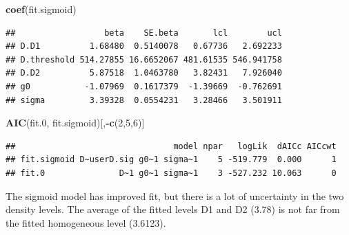 \documentclass[
]{book}
\newenvironment{Shaded}{\begin{snugshade}}{\end{snugshade}}
\newcommand{\DecValTok}[1]{\textcolor[rgb]{0.00,0.00,0.81}{#1}}
\newcommand{\FloatTok}[1]{\textcolor[rgb]{0.00,0.00,0.81}{#1}}
\newcommand{\FunctionTok}[1]{\textcolor[rgb]{0.13,0.29,0.53}{\textbf{#1}}}
\newcommand{\NormalTok}[1]{#1}
\newcommand{\SpecialCharTok}[1]{\textcolor[rgb]{0.81,0.36,0.00}{\textbf{#1}}}
\begin{document}
\begin{Shaded}
\begin{Highlighting}[]
\FunctionTok{coef}\NormalTok{(fit.sigmoid)}
\end{Highlighting}
\end{Shaded}

\begin{verbatim}
##                  beta    SE.beta       lcl        ucl
## D.D1          1.68480  0.5140078   0.67736   2.692233
## D.threshold 514.27855 16.6652067 481.61535 546.941758
## D.D2          5.87518  1.0463780   3.82431   7.926040
## g0           -1.07969  0.1617379  -1.39669  -0.762691
## sigma         3.39328  0.0554231   3.28466   3.501911
\end{verbatim}

\begin{Shaded}
\begin{Highlighting}[]
\FunctionTok{AIC}\NormalTok{(fit}\FloatTok{.0}\NormalTok{, fit.sigmoid)[,}\SpecialCharTok{{-}}\FunctionTok{c}\NormalTok{(}\DecValTok{2}\NormalTok{,}\DecValTok{5}\NormalTok{,}\DecValTok{6}\NormalTok{)]}
\end{Highlighting}
\end{Shaded}

\begin{verbatim}
##                                model npar   logLik  dAICc AICcwt
## fit.sigmoid D~userD.sig g0~1 sigma~1    5 -519.779  0.000      1
## fit.0               D~1 g0~1 sigma~1    3 -527.232 10.063      0
\end{verbatim}

The sigmoid model has improved fit, but there is a lot of uncertainty in the two density levels. The average of the fitted levels D1 and D2 (3.78) is not far from the fitted homogeneous level (3.6123).
\end{document}
